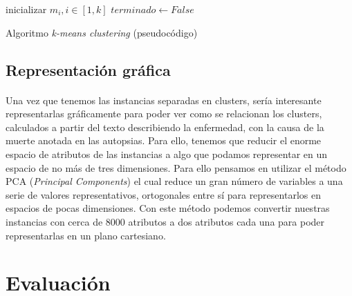 \documentclass[10pt,a4paper]{article}
\begin{document}
	\begin{algorithm}
		\SetAlgoLined
		
		\BlankLine
		inicializar $m_i, i \in [1, k]$\;
		$terminado \leftarrow False$\;
		\caption{Algoritmo \textit{k-means clustering} (pseudocódigo)}
	\end{algorithm}

	\subsection{Representación gráfica}
	\paragraph{}
	Una vez que tenemos las instancias separadas en clusters, sería interesante representarlas gráficamente para poder ver como se relacionan los clusters, calculados a partir del texto describiendo la enfermedad, con la causa de la muerte anotada en las autopsias. Para ello, tenemos que reducir el enorme espacio de atributos de las instancias a algo que podamos representar en un espacio de no más de tres dimensiones. Para ello pensamos en utilizar el método PCA (\textit{Principal Components}) el cual reduce un gran número de variables a una serie de valores representativos, ortogonales entre sí para representarlos en espacios de pocas dimensiones. Con este método podemos convertir nuestras instancias con cerca de 8000 atributos a dos atributos cada una para poder representarlas en un plano cartesiano.

\section{Evaluación}
\end{document}
